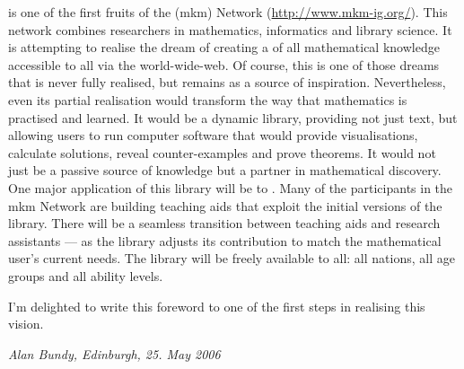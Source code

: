 {\omdoc} is one of the first fruits of the {}
({\sc mkm}) Network (\url{http://www.mkm-ig.org/}). This network combines researchers in
mathematics, informatics and library science. It is attempting to realise the dream of
creating a {} of all mathematical
knowledge accessible to all via the world-wide-web. Of course, this is one of those dreams
that is never fully realised, but remains as a source of inspiration. Nevertheless, even
its partial realisation would transform the way that mathematics is practised and
learned. It would be a dynamic library, providing not just text, but allowing users to run
computer software that would provide visualisations, calculate solutions, reveal
counter-examples and prove theorems. It would not just be a passive source of knowledge
but a partner in mathematical discovery. One major application of this library will be to
{}. Many of the participants in the {\sc mkm} Network are building
teaching aids that exploit the initial versions of the library. There will be a seamless
transition between teaching aids and research assistants --- as the library adjusts its
contribution to match the mathematical user's current needs. The library will be freely
available to all: all nations, all age groups and all ability levels.

I'm delighted to write this foreword to one of the first steps in realising this vision.

\hfill {\emph{Alan Bundy, Edinburgh, 25. May 2006}}


